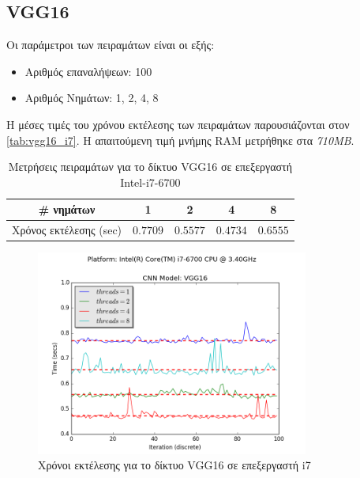 
\subsection{VGG16}

Οι παράμετροι των πειραμάτων είναι οι εξής:
\begin{itemize}
  \item{Αριθμός επαναλήψεων: 100}
  \item{Αριθμός Νημάτων: 1, 2, 4, 8}
\end{itemize}

Η μέσες τιμές του χρόνου εκτέλεσης των πειραμάτων παρουσιάζονται στον \autoref{tab:vgg16_i7}.
Η απαιτούμενη τιμή μνήμης RAM μετρήθηκε στα \emph{710MB}.

\begin{table}[H]
  \begin{center}
    \caption{Μετρήσεις πειραμάτων για το δίκτυο VGG16 σε επεξεργαστή Intel-i7-6700}
    \label{tab:vgg16_i7}
    \begin{tabular}{ | c | c | c | c | c | }
      \hline
      \rowcolor{Gray}
      \# νημάτων & 1 & 2 & 4 & 8 \\
      \hline
      Χρόνος εκτέλεσης (sec) & $0.7709$ & $0.5577$ & $0.4734$ & $0.6555$ \\
      \hline
    \end{tabular}
  \end{center}
\end{table}

\begin{figure}[H]
  \centering
  \includegraphics[width=0.8\textwidth]{./images/chapter6/benchmark_vgg16_i7.png}
  \caption[Χρόνoι εκτέλεσης για το δίκτυο VGG16 σε επεξεργαστή i7]{Χρόνοι εκτέλεσης για το δίκτυο VGG16 σε επεξεργαστή i7}
  \label{fig:vgg16_results_i7}
\end{figure}



